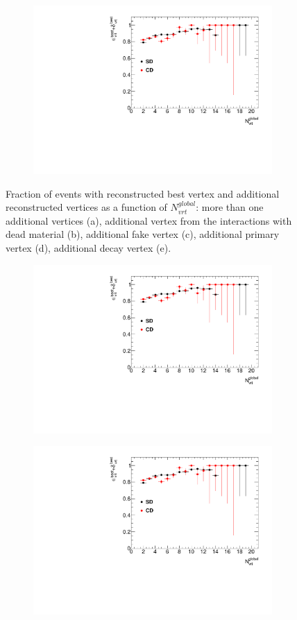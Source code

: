 \begin{figure}[H]
{\begin{subfigure}[b]{\linewidth}{
					{\includegraphics[width=\linewidth, page=16]{graphics/vertexing/vertexEffi.pdf}}}
			\end{subfigure}
		}
	\caption[Fraction of events with reconstructed best vertex and additional reconstructed vertices  as a function of $N_{vrt}^{global}$]{Fraction of events with reconstructed best vertex and additional reconstructed vertices as a function of $N_{vrt}^{global}$: more than one additional vertices (a), additional vertex from the interactions with dead material (b), additional fake vertex (c), additional primary vertex (d), additional decay vertex (e).}
	\label{fig:vertexAdditional}
\end{figure}
\begin{figure}[H]
	\centering
	\parbox{0.3\textwidth}{
		\centering
		\begin{subfigure}[b]{\linewidth}{
				{\includegraphics[width=\linewidth, page=22]{graphics/vertexing/vertexEffi.pdf}}}
		\end{subfigure}
	}
	\quad
	\parbox{0.3\textwidth}{
		\centering
		\begin{subfigure}[b]{\linewidth}{
				{\includegraphics[width=\linewidth, page=25]{graphics/vertexing/vertexEffi.pdf}}}

\end{subfigure}}
\end{figure}
